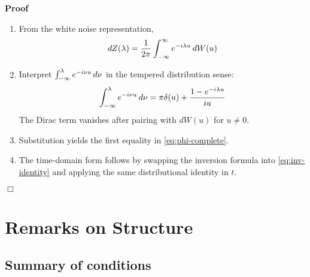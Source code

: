 \documentclass{article}
\newenvironment{proof}{\noindent\textbf{Proof\ }}{\hspace*{\fill}$\Box$\medskip}
\begin{document}
\begin{proof}
  \begin{enumerate}
    \item From the white noise representation,
    \begin{equation}
      dZ (\lambda) = \frac{1}{2 \pi}  \int_{- \infty}^{\infty} e^{- i \lambda
      u}  \hspace{0.17em} dW (u)
    \end{equation}
    \item Interpret $\int_{- \infty}^{\lambda} e^{- i \nu u}  \hspace{0.17em}
    d \nu$ in the tempered distribution sense:
    \begin{equation}
      \int_{- \infty}^{\lambda} e^{- i \nu u}  \hspace{0.17em} d \nu = \pi
      \delta (u) + \frac{1 - e^{- i \lambda u}}{iu}
    \end{equation}
    The Dirac term vanishes after pairing with $dW (u)$ for $u \neq 0$.
    
    \item Substitution yields the first equality in \eqref{eq:phi-complete}.
    
    \item The time-domain form follows by swapping the inversion formula into
    \eqref{eq:inv-identity} and applying the same distributional identity in
    $t$.
  \end{enumerate}
\end{proof}

\section{Remarks on Structure}

\subsection*{Summary of conditions}
\end{document}
